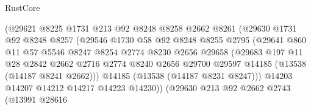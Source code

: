 \begin{lexlean}{RustCore}
\begin{coremodule}
                              (@29621
                                @8225
                                @1731
                                @213
                                @92
                                @8248
                                @8258
                                @2662
                                @8261
                                (@29630
                                  @1731
                                  @92
                                  @8248
                                  @8257
                                  (@29546
                                    @1730
                                    @58
                                    @92
                                    @8248
                                    @8255
                                    @2795
                                    (@29641
                                      @860
                                      @11
                                      @57
                                      @5546
                                      @8247
                                      @8254
                                      @2774
                                      @8230
                                      @2656
                                      @29658
                                      (@29683
                                        @197
                                        @11
                                        @28
                                        @2842
                                        @2662
                                        @2716
                                        @2774
                                        @8240
                                        @2656
                                        @29700
                                        @29597
                                        @14185
                                        (@13538 (@14187 @8241 @2662)))
                                      @14185
                                      (@13538 (@14187 @8231 @8247)))
                                    @14203
                                    @14207
                                    @14212
                                    @14217
                                    @14223
                                    @14230))
                                (@29630
                                  @213
                                  @92
                                  @2662
                                  @2743
                                  (@13991
                                    @28616

\end{coremodule}
\end{lexlean}
